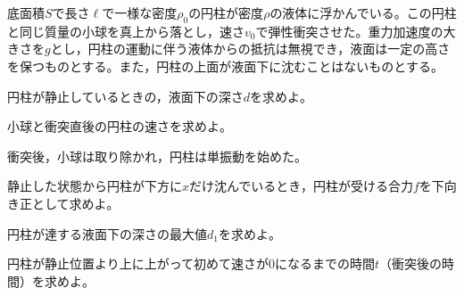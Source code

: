 \hakosyokika
\item
    \begin{mawarikomi}{150pt}{}
        底面積$S$で長さ$\ell $で一様な密度$\rho _0$の円柱が密度$\rho $の液体に浮かんでいる。この円柱と同じ質量の小球を真上から落とし，速さ$v_0$で弾性衝突させた。重力加速度の大きさを$g$とし，円柱の運動に伴う液体からの抵抗は無視でき，液面は一定の高さを保つものとする。また，円柱の上面が液面下に沈むことはないものとする。
        \begin{Enumerate}
            \item 円柱が静止しているときの，液面下の深さ$d$を求めよ。
            \item 小球と衝突直後の円柱の速さを求めよ。 
        \end{Enumerate}
        衝突後，小球は取り除かれ，円柱は単振動を始めた。
        \begin{Enumerate*}
            \item 静止した状態から円柱が下方に$x$だけ沈んでいるとき，円柱が受ける合力$f$を下向き正として求めよ。
            \item 円柱が達する液面下の深さの最大値$d_1$を求めよ。
            \item 円柱が静止位置より上に上がって初めて速さが0になるまでの時間$t$（衝突後の時間）を求めよ。
        \end{Enumerate*}
    \end{mawarikomi}